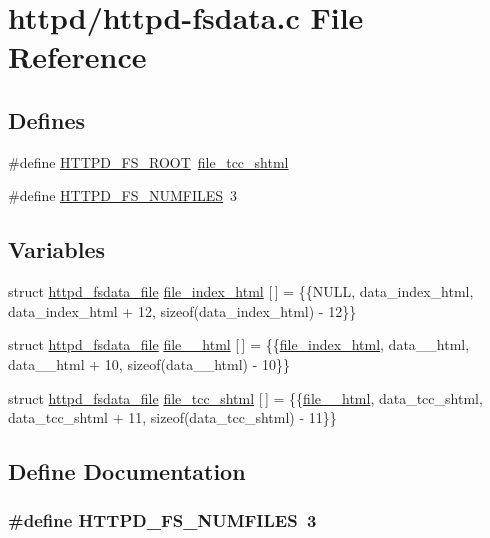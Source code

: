 \hypertarget{httpd-fsdata_8c}{
\section{httpd/httpd-\/fsdata.c File Reference}
\label{httpd-fsdata_8c}
}
\subsection*{Defines}
\begin{DoxyCompactItemize}
\item 
\#define \hyperlink{httpd-fsdata_8c_ad3cba2495e43b8b94875657c9e32c5ec}{HTTPD\_\-FS\_\-ROOT}~\hyperlink{httpd-fsdata_8c_aff9178f8d1f6c4665e6bd22e22f4b78b}{file\_\-tcc\_\-shtml}
\item 
\#define \hyperlink{httpd-fsdata_8c_a9c9e7b40a5d87537604a358e14902fb7}{HTTPD\_\-FS\_\-NUMFILES}~3
\end{DoxyCompactItemize}
\subsection*{Variables}
\begin{DoxyCompactItemize}
\item 
struct \hyperlink{structhttpd__fsdata__file}{httpd\_\-fsdata\_\-file} \hyperlink{httpd-fsdata_8c_afaff04f8c298dff87119cd02af091093}{file\_\-index\_\-html} \mbox{[}$\,$\mbox{]} = \{\{NULL, data\_\-index\_\-html, data\_\-index\_\-html + 12, sizeof(data\_\-index\_\-html) -\/ 12\}\}
\item 
struct \hyperlink{structhttpd__fsdata__file}{httpd\_\-fsdata\_\-file} \hyperlink{httpd-fsdata_8c_a90d9c213dbaa0c0e2ed4a1c4d3d28c54}{file\_\_\-html} \mbox{[}$\,$\mbox{]} = \{\{\hyperlink{httpd-fsdata_8c_afaff04f8c298dff87119cd02af091093}{file\_\-index\_\-html}, data\_\_\-html, data\_\_\-html + 10, sizeof(data\_\_\-html) -\/ 10\}\}
\item 
struct \hyperlink{structhttpd__fsdata__file}{httpd\_\-fsdata\_\-file} \hyperlink{httpd-fsdata_8c_aff9178f8d1f6c4665e6bd22e22f4b78b}{file\_\-tcc\_\-shtml} \mbox{[}$\,$\mbox{]} = \{\{\hyperlink{httpd-fsdata_8c_a90d9c213dbaa0c0e2ed4a1c4d3d28c54}{file\_\_\-html}, data\_\-tcc\_\-shtml, data\_\-tcc\_\-shtml + 11, sizeof(data\_\-tcc\_\-shtml) -\/ 11\}\}
\end{DoxyCompactItemize}


\subsection{Define Documentation}
\hypertarget{httpd-fsdata_8c_a9c9e7b40a5d87537604a358e14902fb7}{
\subsubsection[{HTTPD\_\-FS\_\-NUMFILES}]{\setlength{\rightskip}{0pt plus 5cm}\#define HTTPD\_\-FS\_\-NUMFILES~3}}
\label{httpd-fsdata_8c_a9c9e7b40a5d87537604a358e14902fb7}



